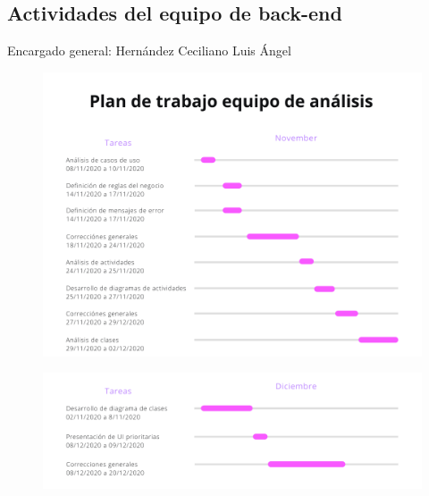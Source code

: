 \documentclass[12pt,letterpaper]{article}
\begin{document}
        \subsection{Actividades del equipo de back-end}
        Encargado general: Hernández Ceciliano Luis Ángel
            \begin{figure}[H]
                \centering
                \includegraphics [scale=0.6]{gantt/anaNov}
            \end{figure}
            \begin{figure}[H]
                \centering
                \includegraphics [scale=0.6]{gantt/anaDec}
            \end{figure}
\end{document}
